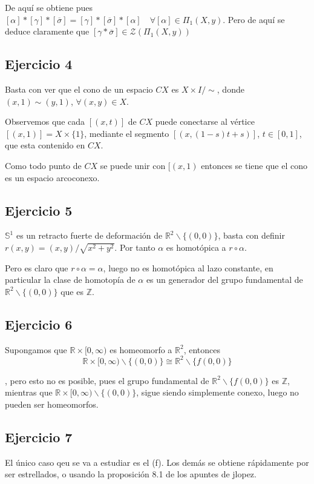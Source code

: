 \documentclass{article}
\begin{document}
De aquí se obtiene pues $[\alpha]*[\gamma]*[\overline{\sigma}]=[\gamma]*[\overline{\sigma}]*[\alpha] \quad \forall [\alpha]\in \Pi_1(X,y)$. Pero de aquí se deduce claramente que $[\gamma*\overline{\sigma}]\in \mathcal{Z}(\Pi_1(X,y))$

\subsection{Ejercicio 4}
Basta con ver que el cono de un espacio $CX$ es $X\times I/\sim$, donde $(x,1)\sim (y,1)$, $\forall (x,y)\in X$.

Observemos que cada $[(x,t)]$ de $CX$ puede conectarse al vértice $[(x,1)]=X\times \{1\}$, mediante el segmento $[(x,(1-s)t+s)]$, $t\in [0,1]$, que esta contenido en $CX$.

Como todo punto de $CX$ se puede unir con $[(x,1)$ entonces se tiene que el cono es un espacio arcoconexo.

\subsection{Ejercicio 5}
$\mathbb{S}^1$ es un retracto fuerte de deformación de $\mathbb{R}^2\backslash \{(0,0)\}$, basta con definir $r(x,y)=(x,y)/\sqrt{x^2+y^2}$. Por tanto $\alpha$ es homotópica a $r\circ \alpha$.

Pero es claro que $r\circ \alpha=\alpha$, luego no es homotópica al lazo constante, en particular la clase de homotopía de $\alpha$ es un generador del grupo fundamental de $\mathbb{R}^2\backslash\{(0,0)\}$ que es $\mathbb{Z}$.

\subsection{Ejercicio 6}
Supongamos que $\mathbb{R}\times [0,\infty)$ es homeomorfo a $\mathbb{R}^2$, entonces 
\begin{equation*}
\mathbb{R}\times [0,\infty)\backslash \{(0,0)\}\cong\mathbb{R}^2\backslash\{f(0,0)\}
\end{equation*}

, pero esto no es posible, pues el grupo fundamental de $\mathbb{R}^2\backslash\{f(0,0)\}$ es $\mathbb{Z}$, mientras que $\mathbb{R}\times [0,\infty)\backslash \{(0,0)\}$, sigue siendo simplemente conexo, luego no pueden ser homeomorfos.

\subsection{Ejercicio 7}
El único caso qeu se va a estudiar es el (f). Los demás se obtiene rápidamente por ser estrellados, o usando la proposición 8.1 de los apuntes de jlopez.
\end{document}
